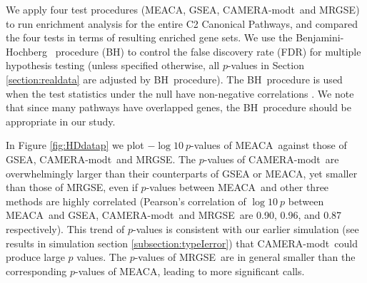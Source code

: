 \documentclass[a4,center,fleqn]{NAR}
\newcommand{\OurMethod}{MEACA}
\newcommand{\CMT}{CAMERA-modt}
\newcommand{\genr}{MRGSE}
\newcommand{\FDR}{Benjamini-Hochberg}
\newcommand{\FDRabb}{BH}
\begin{document}
	
	
	We apply four test procedures (\OurMethod, GSEA, \CMT~and \genr) to run enrichment analysis 
	for	the entire C2 Canonical Pathways, and compared the four tests in terms of resulting
	enriched gene sets. %
	We use the \FDR~\citep{benjamini1995controlling} procedure (\FDRabb) to control the false
	discovery rate (FDR) for multiple hypothesis testing (unless specified otherwise, all 
	$p$-values in Section \ref{section:realdata} are adjusted by \FDRabb~procedure). The 
	\FDRabb~procedure is used when the test statistics under the null have non-negative 
	correlations \citep{benjamini2001control}. We note that since many pathways have overlapped 
	genes, the \FDRabb~procedure should be appropriate in our study.
	
	In Figure \ref{fig:HDdatap} we plot $-\log 10~p$-values of \OurMethod~against those of GSEA, 
	\CMT~and \genr.
	The $p$-values of \CMT~are overwhelmingly larger than their counterparts of GSEA or \OurMethod, 
	yet smaller than those of \genr, even 
	if $p$-values between \OurMethod~and other three methods are highly correlated (Pearson's 
	correlation of $\log 10 ~p$ between \OurMethod~and GSEA, \CMT~and \genr~are 0.90, 0.96, and 
	0.87 respectively). This trend of $p$-values is consistent with our earlier simulation (see 
	results in simulation section \ref{subsection:typeIerror}) that
	\CMT~could produce large $p$ values. The $p$-values of \genr~are in general smaller than the 
	corresponding $p$-values of \OurMethod, leading to more significant calls. 
		
\end{document}
